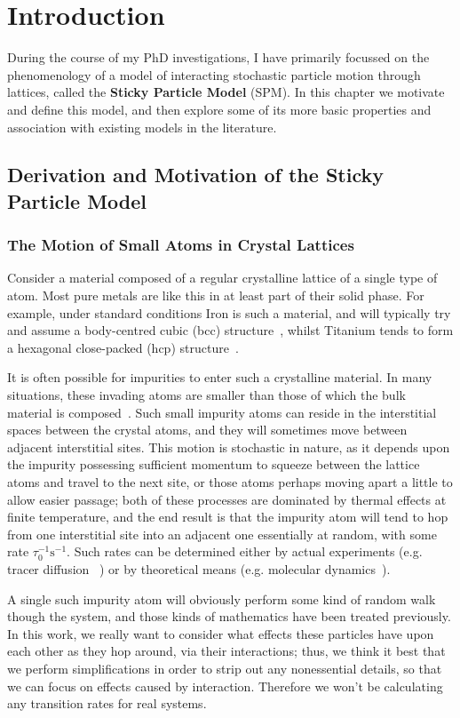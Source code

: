 \chapter{Introduction}
During the course of my PhD investigations, I have primarily focussed on the phenomenology of a model of
interacting stochastic particle motion through lattices, called the \textbf{Sticky Particle Model} (SPM). In
this chapter we motivate and define this model, and then explore some of its more basic properties and
association with existing models in the literature.

\section{Derivation and Motivation of the Sticky Particle Model}
\subsection{The Motion of Small Atoms in Crystal Lattices}
Consider a material composed of a regular crystalline lattice of a single type of atom. Most pure metals
are like this in at least part of their solid phase. For example, under standard conditions Iron is such
a material, and will typically try and assume a body-centred cubic (bcc) structure~\cite{Villars2016}, whilst Titanium tends to
form a hexagonal close-packed (hcp) structure~\cite{Patterson1925}.

It is often possible for impurities to enter such a crystalline material.  In many
situations, these invading atoms are smaller than those of
which the bulk material is composed~\cite{DealGrove1965, tegner2015}. Such small impurity atoms can reside in the interstitial spaces between 
the crystal atoms, and they will sometimes move between adjacent interstitial sites. This motion is
stochastic in nature, as it depends upon the impurity possessing sufficient momentum to squeeze between
the lattice atoms and travel to the next site, or those atoms perhaps moving apart a little to allow easier
passage; both of these processes are dominated by thermal effects at finite temperature, and the end result
is that the impurity atom will tend to hop from one interstitial site into an
adjacent one essentially at random, with some rate $\tau_0 ^{-1} \mathrm{s}^{-1}$.
Such rates can be determined either by actual experiments (e.g. tracer diffusion
~\cite{Lamb1946, Wersin2004}) or by theoretical means
(e.g. molecular dynamics~\cite{Zhang1994, keffer2001}).

A single such impurity atom will obviously perform some kind of random walk though the system, and those kinds
of mathematics have been treated previously. In this work, we really want to consider what effects these
particles have upon each other as they hop around, via their interactions; thus, we think it best that we
perform simplifications in order to strip out any nonessential details, so that we can focus on effects 
caused by interaction. Therefore we won't be calculating any
transition rates for real systems.

